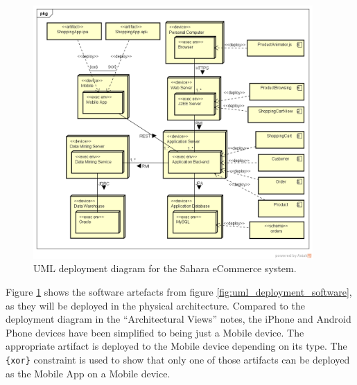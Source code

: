 \documentclass{csse4400}
\begin{document}
\begin{figure}[h!]
    \centering
    \includegraphics[trim=38 50 23 45,clip,width=0.95\textwidth]{images/uml-deployment.png}
    \caption{UML deployment diagram for the Sahara eCommerce system.}
    \label{fig:uml_deployment}
\end{figure}

\noindent
Figure \ref{fig:uml_deployment} shows the software artefacts from figure \ref{fig:uml_deployment_software},
as they will be deployed in the physical architecture.
Compared to the deployment diagram in the ``Architectural Views'' notes,
the iPhone and Android Phone devices have been simplified to being just a Mobile device.
The appropriate artifact is deployed to the Mobile device depending on its type.
The \texttt{\{xor\}} constraint is used to show that only one of those artifacts can be deployed as the Mobile App on a Mobile device.

\end{document}
